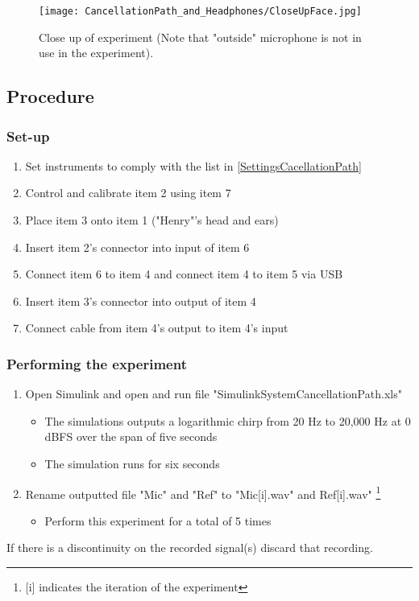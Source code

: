 \begin{figure}[H]
	\centering
	\texttt{[image: CancellationPath\_and\_Headphones/CloseUpFace.jpg]}
	\caption{Close up of experiment (Note that "outside" microphone is not in use in the experiment).}
	\label{CloseUpCancellationPath}
\end{figure}

\subsection{Procedure}
\subsubsection{Set-up}
\begin{enumerate}
	\item Set instruments to comply with the list in \ref{SettingsCacellationPath}
	\item Control and calibrate item 2 using item 7
	\item Place item 3 onto item 1 ("Henry"'s head and ears)
	\item Insert item 2's connector into input of item 6
	\item Connect item 6 to item 4 and connect item 4 to item 5 via USB
	\item Insert item 3's connector into output of item 4
	\item Connect cable from item 4's output to item 4's input
\end{enumerate}

\subsubsection{Performing the experiment}
\begin{enumerate}
	\item Open Simulink\textsuperscript{\textregistered} and open and run file "SimulinkSystemCancellationPath.xls"
	\begin{itemize} 
		\item The simulations outputs a logarithmic chirp from 20 Hz to 20,000 Hz at 0 dBFS over the span of five seconds
		\item The simulation runs for six seconds
	\end{itemize}
	\item Rename outputted file "Mic" and "Ref" to "Mic[i].wav" and Ref[i].wav" \footnote{[i] indicates the iteration of the experiment}
	\begin{itemize}
		\item[] Perform this experiment for a total of 5 times
	\end{itemize}
\end{enumerate}
If there is a discontinuity  on the recorded signal(s) discard that recording.


